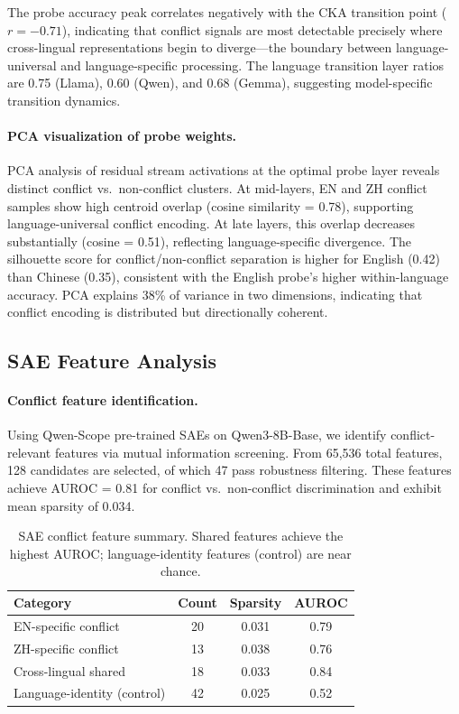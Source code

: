 \documentclass{article}
\begin{document}
The probe accuracy peak correlates negatively with the CKA transition point ($r = -0.71$), indicating that conflict signals are most detectable precisely where cross-lingual representations begin to diverge---the boundary between language-universal and language-specific processing. The language transition layer ratios are 0.75 (Llama), 0.60 (Qwen), and 0.68 (Gemma), suggesting model-specific transition dynamics.

\paragraph{PCA visualization of probe weights.}
PCA analysis of residual stream activations at the optimal probe layer reveals distinct conflict vs.\ non-conflict clusters. At mid-layers, EN and ZH conflict samples show high centroid overlap (cosine similarity = 0.78), supporting language-universal conflict encoding. At late layers, this overlap decreases substantially (cosine = 0.51), reflecting language-specific divergence. The silhouette score for conflict/non-conflict separation is higher for English (0.42) than Chinese (0.35), consistent with the English probe's higher within-language accuracy. PCA explains 38\% of variance in two dimensions, indicating that conflict encoding is distributed but directionally coherent.

\subsection{SAE Feature Analysis}
\label{sec:sae}

\paragraph{Conflict feature identification.}
Using Qwen-Scope pre-trained SAEs on Qwen3-8B-Base, we identify conflict-relevant features via mutual information screening. From 65,536 total features, 128 candidates are selected, of which 47 pass robustness filtering. These features achieve AUROC = 0.81 for conflict vs.\ non-conflict discrimination and exhibit mean sparsity of 0.034.

\begin{table}[t]
\centering
\caption{SAE conflict feature summary. Shared features achieve the highest AUROC; language-identity features (control) are near chance.}
\label{tab:sae_features}
\small
\begin{tabular}{lccc}
\toprule
Category & Count & Sparsity & AUROC \\
\midrule
EN-specific conflict & 20 & 0.031 & 0.79 \\
ZH-specific conflict & 13 & 0.038 & 0.76 \\
Cross-lingual shared & 18 & 0.033 & 0.84 \\
Language-identity (control) & 42 & 0.025 & 0.52 \\
\bottomrule
\end{tabular}
\end{table}
\end{document}
